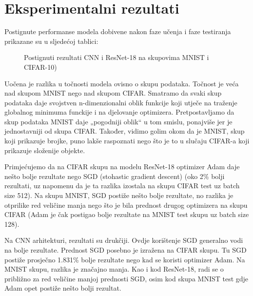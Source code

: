 \chapter{Eksperimentalni rezultati}

Postignute performanse modela dobivene nakon faze učenja i faze testiranja prikazane su u sljedećoj tablici:

\begin{figure}[h]
	\caption{Postignuti rezultati CNN i ResNet-18 na skupovima MNIST i CIFAR-10)}
	\label{performancetable}
\end{figure}

\bigskip

Uočena je razlika u točnosti modela ovisno o skupu podataka. Točnost je veća nad skupom MNIST nego nad skupom CIFAR. Smatramo da svaki skup podataka daje svojstven n-dimenzionalni oblik funkcije koji utječe na traženje globalnog minimuma funckije i na djelovanje optimizera. Pretpostavljamo da skup podataka MNIST daje „pogodniji oblik“ u tom smislu, ponajviše jer je jednostavniji od skupa CIFAR.  Također, vidimo golim okom da je MNIST, skup koji prikazuje brojke, puno lakše raspoznati nego što je to u slučaju CIFAR-a koji prikazuje složenije objekte.

\bigskip

Primjećujemo da na CIFAR skupu na modelu ResNet-18 optimizer Adam daje nešto bolje rezultate nego SGD (stohastic gradient descent) (oko 2\% bolji rezultati, uz napomenu da je ta razlika izostala na skupu CIFAR test uz batch size 512). Na skupu MNIST, SGD postiže nešto bolje rezultate, no razlika je otprilike red veličine manja nego što je bila prednost drugog optimizera na skupu CIFAR (Adam je čak postigao bolje rezultate na MNIST test skupu uz batch size 128).

\bigskip

Na CNN arhitekturi, rezultati su drukčiji. Ovdje korištenje SGD generalno vodi na bolje rezultate. Prednost SGD posebno je izražena na CIFAR skupu. Tu SGD postiže prosječno 1.831\% bolje rezultate nego kad se koristi optimizer Adam. Na MNIST skupu, razlika je značajno manja. Kao i kod ResNet-18, radi se o približno za red veličine manjoj prednosti SGD, osim kod skupa MNIST test gdje Adam opet postiže nešto bolji rezultat.

